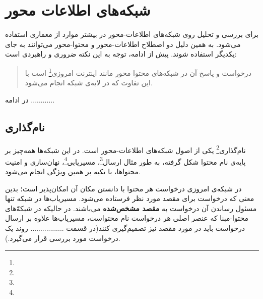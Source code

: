 
\chapter{شبکه‌های اطلاعات محور}

%	
%	
%	
%	
%	

برای بررسی و تحلیل روی شبکه‌های اطلاعات-محور در بیشتر موارد از معماری  استفاده می‌شود. به همین دلیل دو اصطلاح اطلاعات-محور و محتوا-محور می‌توانند به جای یکدیگر استفاده شوند. پیش از ادامه‌، توجه به این نکته ضروری و راهبردی است:
\begin{quote}
	درخواست و پاسخ آن در شبکه‌های محتوا-محور مانند اینترنت امروزی\footnote{} است با این تفاوت که در لایه‌ی شبکه انجام می‌شود.
\end{quote}

در ادامه ............



\section{نام‌گذاری}
نام‌گذاری\footnote{} یکی از اصول شبکه‌های اطلاعات-محور است. در این شبکه‌ها همه‌چیز بر پایه‌ی نام محتوا شکل گرفته، به طور مثال ارسال\footnote{}، مسیریابی\footnote{}، نهان‌سازی و امنیت محتواها، با تکیه بر همین ویژگی انجام می‌شود. 

در شبکه‌ی امروزی درخواست هر محتوا با دانستن مکان آن امکان‌پذیر است؛ بدین معنی که درخواست برای مقصد مورد نظر فرستاده می‌شود. مسیریاب‌ها در شبکه تنها مسئول رساندن آن درخواست به \textbf{مقصد مشخص‌شده} می‌باشند. در حالیکه در شبکه‌ّهای محتوا-مبنا که عنصر اصلی هر درخواست نام محتواست، مسیریاب‌ها علاوه بر ارسال درخواست باید در مورد مقصد نیز تصمیم‌گیری کنند(در قسمت ................. روند یک درخواست مورد بررسی قرار می‌گیرد.).

